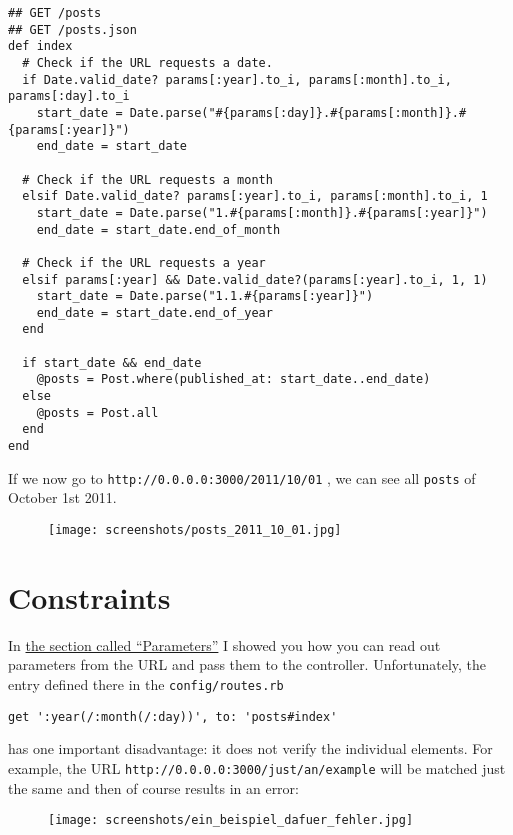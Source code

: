 \documentclass[a4paper]{book}
\newcommand{\chap}[1]{\newpage\thispagestyle{empty}\chapter{#1}\label{chap:\thechapter}}
\begin{document}
\begin{shaded}\begin{verbatim}
## GET /posts
## GET /posts.json
def index
  # Check if the URL requests a date.
  if Date.valid_date? params[:year].to_i, params[:month].to_i, params[:day].to_i
    start_date = Date.parse("#{params[:day]}.#{params[:month]}.#{params[:year]}")
    end_date = start_date

  # Check if the URL requests a month
  elsif Date.valid_date? params[:year].to_i, params[:month].to_i, 1
    start_date = Date.parse("1.#{params[:month]}.#{params[:year]}")
    end_date = start_date.end_of_month

  # Check if the URL requests a year
  elsif params[:year] && Date.valid_date?(params[:year].to_i, 1, 1)
    start_date = Date.parse("1.1.#{params[:year]}")
    end_date = start_date.end_of_year
  end

  if start_date && end_date
    @posts = Post.where(published_at: start_date..end_date)
  else
    @posts = Post.all
  end
end
\end{verbatim}\end{shaded}

If we now go to \texttt{http://0.0.0.0:3000/2011/10/01} , we can see all \texttt{posts} of October 1st 2011.

\begin{figure}[htbp]
\centering
\texttt{[image: screenshots/posts\_2011\_10\_01.jpg]}
\end{figure}

\chap{Constraints}\label{constraints}

In \hyperref[routesux5fmatchux5fparameter]{the section called “Parameters”} I showed you how you can read out parameters from the URL and pass them to the controller. Unfortunately, the entry defined there in the \texttt{config/routes.rb}

\begin{shaded}\begin{verbatim}
get ':year(/:month(/:day))', to: 'posts#index'
\end{verbatim}\end{shaded}

has one important disadvantage: it does not verify the individual elements. For example, the URL \texttt{http://0.0.0.0:3000/just/an/example} will be matched just the same and then of course results in an error:

\begin{figure}[htbp]
\centering
\texttt{[image: screenshots/ein\_beispiel\_dafuer\_fehler.jpg]}
\end{figure}
\end{document}
